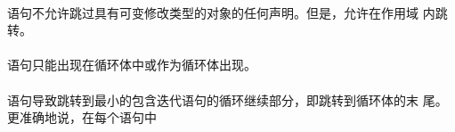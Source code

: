 {\paragraph{}
\ex {}语句不允许跳过具有可变修改类型的对象的任何声明。但是，允许在作用域
内跳转。

\constraint
\paragraph{}
语句只能出现在循环体中或作为循环体出现。

\semantic
\paragraph{}
语句导致跳转到最小的包含迭代语句的循环继续部分，即跳转到循环体的末
尾。更准确地说，在每个语句中                                                  \\
\begin{minipage}{0.30\linewidth}
\mbox{\hspace{0em}}                                  \\
  \mbox{\hspace{2em}}                                           \\
  \mbox{\hspace{2em}}                                           \\
  \mbox{\hspace{2em}}                                           \\
\mbox{\hspace{0em}}                                               \\
\mbox{\hspace{0em}\tm{\}}}
\end{minipage}
\hfill
\begin{minipage}{0.30\linewidth}
\mbox{\hspace{0em}}                                                 \\
  \mbox{\hspace{2em}}                                           \\
  \mbox{\hspace{2em}}                                           \\

\end{minipage}}
